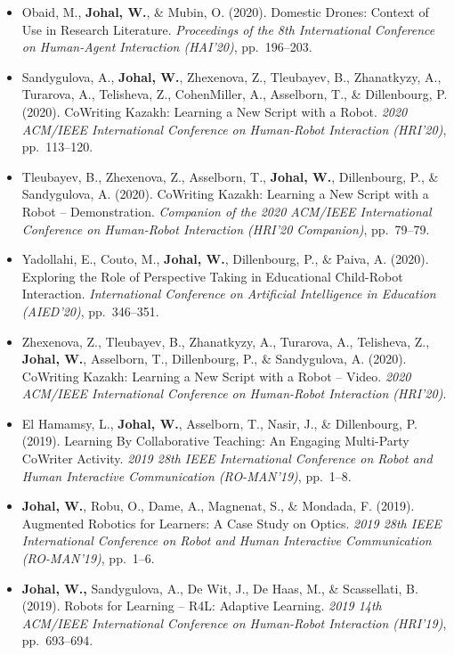 \begin{itemize}[nosep]
    \item Obaid, M., \textbf{Johal, W.}, \& Mubin, O. (2020). Domestic Drones: Context of Use in Research Literature. \textit{Proceedings of the 8th International Conference on Human-Agent Interaction (HAI'20)}, pp.\ 196--203.

    \item Sandygulova, A., \textbf{Johal, W.}, Zhexenova, Z., Tleubayev, B., Zhanatkyzy, A., Turarova, A., Telisheva, Z., CohenMiller, A., Asselborn, T., \& Dillenbourg, P. (2020). CoWriting Kazakh: Learning a New Script with a Robot. \textit{2020 ACM/IEEE International Conference on Human-Robot Interaction (HRI'20)}, pp.\ 113--120.

    \item Tleubayev, B., Zhexenova, Z., Asselborn, T., \textbf{Johal, W.}, Dillenbourg, P., \& Sandygulova, A. (2020). CoWriting Kazakh: Learning a New Script with a Robot -- Demonstration. \textit{Companion of the 2020 ACM/IEEE International Conference on Human-Robot Interaction (HRI'20 Companion)}, pp.\ 79--79.

    \item Yadollahi, E., Couto, M., \textbf{Johal, W.}, Dillenbourg, P., \& Paiva, A. (2020). Exploring the Role of Perspective Taking in Educational Child-Robot Interaction. \textit{International Conference on Artificial Intelligence in Education (AIED'20)}, pp.\ 346--351.

    \item Zhexenova, Z., Tleubayev, B., Zhanatkyzy, A., Turarova, A., Telisheva, Z., \textbf{Johal, W.}, Asselborn, T., Dillenbourg, P., \& Sandygulova, A. (2020). CoWriting Kazakh: Learning a New Script with a Robot -- Video. \textit{2020 ACM/IEEE International Conference on Human-Robot Interaction (HRI'20)}.

    \item El Hamamsy, L., \textbf{Johal, W.}, Asselborn, T., Nasir, J., \& Dillenbourg, P. (2019). Learning By Collaborative Teaching: An Engaging Multi-Party CoWriter Activity. \textit{2019 28th IEEE International Conference on Robot and Human Interactive Communication (RO-MAN'19)}, pp.\ 1--8.

    \item \textbf{Johal, W.}, Robu, O., Dame, A., Magnenat, S., \& Mondada, F. (2019). Augmented Robotics for Learners: A Case Study on Optics. \textit{2019 28th IEEE International Conference on Robot and Human Interactive Communication (RO-MAN'19)}, pp.\ 1--6.

    \item \textbf{Johal, W.,} Sandygulova, A., De Wit, J., De Haas, M., \& Scassellati, B. (2019). Robots for Learning -- R4L: Adaptive Learning. \textit{2019 14th ACM/IEEE International Conference on Human-Robot Interaction (HRI'19)}, pp.\ 693--694.


\end{itemize}
